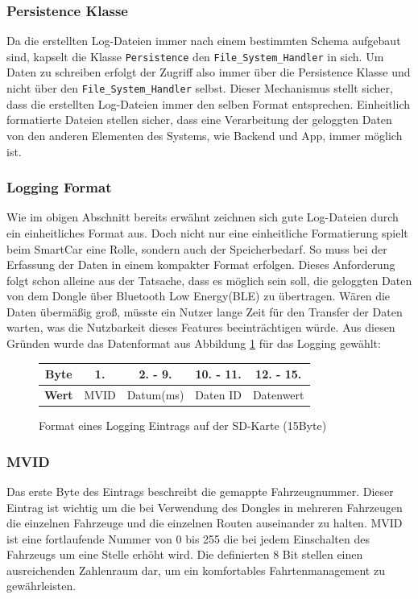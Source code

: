 \subsubsection*{Persistence Klasse}
Da die erstellten Log-Dateien immer nach einem bestimmten Schema aufgebaut sind, kapselt die Klasse \texttt{Persistence} den \texttt{File\_System\_Handler} in sich. Um Daten zu schreiben erfolgt der Zugriff also immer über die Persistence Klasse und nicht über den \texttt{File\_System\_Handler} selbst. Dieser Mechanismus stellt sicher, dass die erstellten Log-Dateien immer den selben Format entsprechen. Einheitlich formatierte Dateien stellen sicher, dass eine Verarbeitung der geloggten Daten von den anderen Elementen des Systems, wie Backend und App, immer möglich ist.
\subsubsection*{Logging Format}
Wie im obigen Abschnitt bereits erwähnt zeichnen sich gute Log-Dateien durch ein einheitliches Format aus. Doch nicht nur eine einheitliche Formatierung spielt beim SmartCar eine Rolle, sondern auch der Speicherbedarf. So muss bei der Erfassung der Daten in einem kompakter Format erfolgen. Dieses Anforderung folgt schon alleine aus der Tatsache, dass es möglich sein soll, die geloggten Daten von dem Dongle über Bluetooth Low Energy(BLE) zu übertragen. Wären die Daten übermäßig groß, müsste ein Nutzer lange Zeit für den Transfer der Daten warten, was die Nutzbarkeit dieses Features beeinträchtigen würde. Aus diesen Gründen wurde das Datenformat aus Abbildung \ref{fig:LoggingEntry} für das Logging gewählt:
\begin{figure}[h]
\begin{center}
  \begin{tabular}{ | c || c | c | c | c |}
    \hline
    \textbf{Byte} & 1. & 2. - 9. & 10. - 11. & 12. - 15. \\ \hline
    \textbf{Wert} & MVID & Datum(ms) & Daten ID & Datenwert \\
    \hline
  \end{tabular}
  \caption{Format eines Logging Eintrags auf der SD-Karte (15Byte)}
  \label{fig:LoggingEntry}
\end{center}
\end{figure}
\subsubsection*{MVID}
Das erste Byte des Eintrags beschreibt die gemappte Fahrzeugnummer. Dieser Eintrag ist wichtig um die bei Verwendung des Dongles in mehreren Fahrzeugen die einzelnen Fahrzeuge und die einzelnen Routen auseinander zu halten. MVID ist eine fortlaufende Nummer von 0 bis 255 die bei jedem Einschalten des Fahrzeugs um eine Stelle erhöht wird. Die definierten 8 Bit stellen einen ausreichenden Zahlenraum dar, um ein komfortables Fahrtenmanagement zu gewährleisten. 
